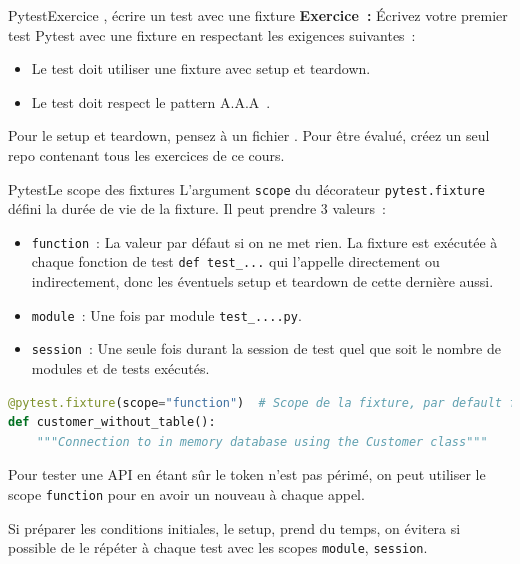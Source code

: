 \documentclass{beamer}
\begin{document}
    \begin{frame}{Pytest}{Exercice \execcounterdispinc{}, écrire un test avec une fixture}
        \transdissolve
        \textbf{Exercice~:} Écrivez votre premier test Pytest avec une fixture en respectant les exigences suivantes~:
        \begin{itemize}
            \item Le test doit utiliser une fixture avec setup et teardown.
            \item Le test doit respect le pattern A.A.A~.
        \end{itemize}
        \bigbreak
        Pour le setup et teardown, pensez à un fichier .
        \bigbreak
        Pour être évalué, créez un seul repo contenant tous les exercices de ce cours.
    \end{frame}

    \begin{frame}[fragile]{Pytest}{Le scope des fixtures}
        \transdissolve
        L'argument \lstinline{scope} du décorateur \lstinline{pytest.fixture} défini la durée de vie
        de la fixture.
        Il peut prendre 3 valeurs~:
        \begin{itemize}
            \item \lstinline{function}~: La valeur par défaut si on ne met rien.
            La fixture est exécutée à chaque fonction de test \lstinline{def test_...} qui l'appelle directement ou indirectement, donc les éventuels setup et teardown de cette dernière aussi.
            \item \lstinline{module}~: Une fois par module \lstinline{test_....py}.
            \item \lstinline{session}~: Une seule fois durant la session de test quel que soit le nombre de modules et de tests exécutés.
        \end{itemize}
        \begin{lstlisting}[language=Python]
@pytest.fixture(scope="function")  # Scope de la fixture, par default function
def customer_without_table():
    """Connection to in memory database using the Customer class"""
        \end{lstlisting}

        Pour tester une API en étant sûr le token n'est pas périmé, on peut utiliser le scope \lstinline{function} pour en avoir un nouveau à chaque appel.

        Si préparer les conditions initiales, le setup, prend du temps, on évitera si possible de le répéter à chaque test avec les scopes \lstinline{module}, \lstinline{session}.
    \end{frame}
\end{document}
